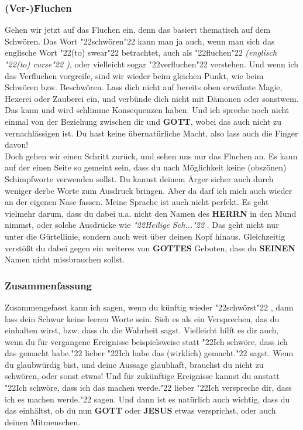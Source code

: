 \documentclass[12pt,a5paper]{article}
\newcommand{\Gottes}[0]{\textbf{GOTTES}}
\newcommand{\Gott}[0]{\textbf{GOTT}}
\newcommand{\Herrn}[0]{\textbf{HERRN}}
\newcommand{\Jesus}[0]{\textbf{JESUS}}
\newcommand{\Seinen}[0]{\textbf{SEINEN}}
\newcommand{\q}[1]{\char"22{#1}\char"22 }
\begin{document}
	\subsubsection{(Ver-)Fluchen}
		Gehen wir jetzt auf das Fluchen ein,
		denn das basiert thematisch auf dem Schw\"oren.
		Das Wort \q{schw\"oren} kann man ja auch,
		wenn man sich das englische Wort \q{(to) swear} betrachtet,
		auch als \q{fluchen} \textit{(englisch \q{(to) curse})},
		oder vielleicht sogar \q{verfluchen} verstehen.
		Und wenn ich das Verfluchen vorgreife,
		sind wir wieder beim gleichen Punkt,
		wie beim Schw\"oren bzw. Beschw\"oren.
		Lass dich nicht auf bereits oben erw\"ahnte Magie,
		Hexerei oder Zauberei ein,
		und verb\"unde dich nicht mit D\"amonen oder sonstwem.
		Das kann und wird schlimme Konsequenzen haben.
		Und ich spreche noch nicht einmal von der Beziehung zwischen dir und {\Gott},
		wobei das auch nicht zu vernachl\"assigen ist.
		Du hast keine \"ubernat\"urliche Macht,
		also lass auch die Finger davon!
		\\
		Doch gehen wir einen Schritt zur\"uck,
		und sehen uns nur das Fluchen an.
		Es kann auf der einen Seite so gemeint sein,
		dass du nach M\"oglichkeit keine (obsz\"onen) Schimpfworte verwenden sollst.
		Du kannst deinem \"Arger sicher auch durch weniger derbe Worte zum Ausdruck bringen.
		Aber da darf ich mich auch wieder an der eigenen Nase fassen.
		Meine Sprache ist auch nicht perfekt.
		Es geht vielmehr darum,
		dass du dabei u.a. nicht den Namen des {\Herrn} in den Mund nimmst,
		oder solche Ausdr\"ucke wie \textit{\q{Heilige Sch...}}.
		Das geht nicht nur unter die G\"urtellinie,
		sondern auch weit \"uber deinen Kopf hinaus.
		Gleichzeitig verst\"o{\ss}t du dabei gegen ein weiteres von {\Gottes} Geboten,
		dass du {\Seinen} Namen nicht missbrauchen sollst.
		
	\subsubsection{Zusammenfassung}
		Zusammengefasst kann ich sagen,
		wenn du k\"unftig wieder \q{schw\"orst},
		dann lass dein Schwur keine leeren Worte sein.
		Sieh es als ein Versprechen,
		das du einhalten wirst,
		bzw. dass du die Wahrheit sagst.
		Vielleicht hilft es dir auch,
		wenn du f\"ur vergangene Ereignisse beispielsweise statt
		\q{Ich schw\"ore, dass ich das gemacht habe.}
		lieber \q{Ich habe das (wirklich) gemacht.} sagst.
		Wenn du glaubw\"urdig bist,
		und deine Aussage glaubhaft,
		brauchst du nicht zu schw\"oren,
		oder sonst etwas!
		Und f\"ur zuk\"unftige Ereignisse kannst du anstatt \q{Ich schw\"ore, dass ich das machen werde.} lieber \q{Ich verspreche dir, dass ich es machen werde.} sagen.
		Und dann ist es nat\"urlich auch wichtig,
		dass du das einh\"altst,
		ob du nun {\Gott} oder {\Jesus} etwas versprichst,
		oder auch deinen Mitmenschen.
		
\end{document}
